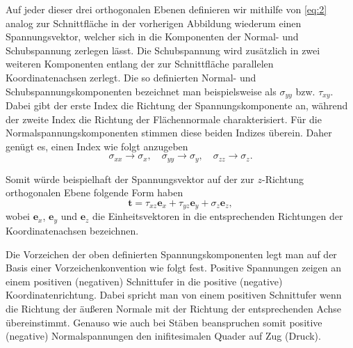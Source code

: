 \documentclass{lecture}
\begin{document}
    Auf jeder dieser drei orthogonalen Ebenen definieren wir mithilfe von \eqref{eq:2} analog zur Schnittfläche in der vorherigen Abbildung wiederum einen Spannungsvektor, welcher sich in die Komponenten der Normal- und Schubspannung zerlegen lässt.
    Die Schubspannung wird zusätzlich in zwei weiteren Komponenten entlang der zur Schnittfläche parallelen Koordinatenachsen zerlegt.
    Die so definierten Normal- und Schubspannungskomponenten bezeichnet man beispielsweise als \(\sigma_{yy}\) bzw. \(\tau_{xy}\).
    Dabei gibt der erste Index die Richtung der Spannungskomponente an, während der zweite Index die Richtung der Flächennormale charakterisiert.
    Für die Normalspannungskomponenten stimmen diese beiden Indizes überein.
    Daher genügt es, einen Index wie folgt anzugeben
    \[
        \sigma_{xx} \to \sigma_x, \quad \sigma_{yy} \to \sigma_y, \quad \sigma_{zz} \to \sigma_z.
    \]

    Somit würde beispielhaft der Spannungsvektor auf der zur \(z\)-Richtung orthogonalen Ebene folgende Form haben
    \[
        \bm{t} = \tau_{xz}\bm{e}_x + \tau_{yz}\bm{e}_y + \sigma_z\bm{e}_z,
    \]
    wobei \(\bm{e}_x\), \(\bm{e}_y\) und \(\bm{e}_z\) die Einheitsvektoren in die entsprechenden Richtungen der Koordinatenachsen bezeichnen.

    Die Vorzeichen der oben definierten Spannungskomponenten legt man auf der Basis einer Vorzeichenkonvention wie folgt fest.
    Positive Spannungen zeigen an einem positiven (negativen) Schnittufer in die positive (negative) Koordinatenrichtung.
    Dabei spricht man von einem positiven Schnittufer wenn die Richtung der äußeren Normale mit der Richtung der entsprechenden Achse übereinstimmt.
    Genauso wie auch bei Stäben beanspruchen somit positive (negative) Normalspannungen den inifitesimalen Quader auf Zug (Druck).
    \begin{center}
    \end{center}
\end{document}
